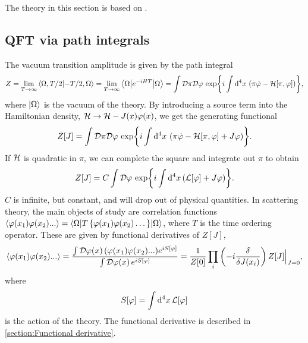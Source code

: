 \label{Free energy and the effective action}
The theory in this section is based on \cite{Peskin:IntroQFT,weinberg_1995,weinberg_1996_vol2,Schwartz:QFT}.

\subsection{QFT via path integrals}
\label{section:path integral}
The vacuum transition amplitude is given by the path integral
\begin{equation}
    Z = \lim_{T\rightarrow \infty} \braket{\Omega, T/2}{-T/2, \Omega}
    = \lim_{T\rightarrow \infty} \left\langle \Omega {\left|  e^{-iHT}  \right|} \Omega \right\rangle
    = \int \mathcal{D} \pi \mathcal{D} \varphi \, \exp{ i \int \dd^4 x \, \left(\pi \dot \varphi - \mathcal{H}[\pi, \varphi]\right) },
\end{equation}
where $\ket{\Omega}$ is the vacuum of the theory.
By introducing a source term into the Hamiltonian density, $\mathcal{H} \rightarrow \mathcal{H} - J(x)\varphi(x)$, we get the generating functional
\begin{equation}
    Z[J] = 
    \int \mathcal{D} \pi \mathcal{D} \varphi \, 
    \exp{ i \int \dd^4 x \, \left(\pi \dot \varphi - \mathcal{H}[\pi, \varphi]+ J\varphi\right) }.
\end{equation}
If $\mathcal{H}$ is quadratic in $\pi$, we can complete the square and integrate out $\pi$ to obtain
\begin{equation}
    Z[J] = C \int \mathcal{D} \varphi \, \exp{i \int \dd^4 x\, (\mathcal{L}[\varphi] + J \varphi)}.
\end{equation}
$C$ is infinite, but constant, and will drop out of physical quantities.
In scattering theory, the main objects of study are correlation functions $\ex{\varphi(x_1)\varphi(x_2)...} = \inner{\Omega}{T\left\{\varphi(x_1)\varphi(x_2)\dots\right\}}{\Omega}$, where $T$ is the time ordering operator.
These are given by functional derivatives of $Z[J]$, 
\begin{equation}
    \label{correlator from generating functional}
    \ex{\varphi(x_1)\varphi(x_2)...}
    = 
    \frac{\int \D \varphi(x)\,  (\varphi(x_1)\varphi(x_2)...) e^{i S[\varphi]}}
        {\int \D \varphi(x)\, e^{i S[\varphi]}}
    =
    \frac{1}{Z[0]} \prod_i\left( -i  \fdv{J(x_i)}\right) Z[J]\Big|_{J = 0},
\end{equation}
where 
\begin{equation}
    S[\varphi] = \int \dd^4 x \, \mathcal{L}[\varphi]
\end{equation}
is the action of the theory.
The functional derivative is described in \autoref{section:Functional derivative}.
